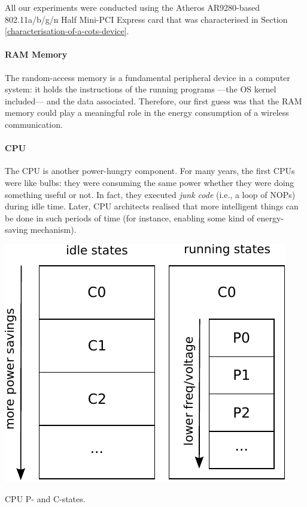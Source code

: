 \documentclass[twoside,nohyper]{tufte-book}
\theoremstyle{definition}
\theoremstyle{definition}
\theoremstyle{definition}
\theoremstyle{remark}
\begin{document}
All our experiments were conducted using the Atheros AR9280-based
802.11a/b/g/n Half Mini-PCI Express card that was characterised in
Section \ref{characterisation-of-a-cots-device}.

\paragraph{RAM Memory}\label{ram-memory}

The random-access memory is a fundamental peripheral device in a
computer system: it holds the instructions of the running programs
---the OS kernel included--- and the data associated. Therefore, our
first guess was that the RAM memory could play a meaningful role in the
energy consumption of a wireless communication.

\paragraph{CPU}\label{cpu}

The CPU is another power-hungry component. For many years, the first
CPUs were like bulbs: they were consuming the same power whether they
were doing something useful or not. In fact, they executed \emph{junk
code} (i.e., a loop of NOPs) during idle time. Later, CPU architects
realised that more intelligent things can be done in such periods of
time (for instance, enabling some kind of energy-saving mechanism).



\begin{marginfigure}

{\centering \includegraphics[width=1\linewidth]{img/04/states} 

}

\caption[CPU P- and C-states.]{CPU P- and C-states.}\label{fig:states}
\end{marginfigure}
\end{document}
